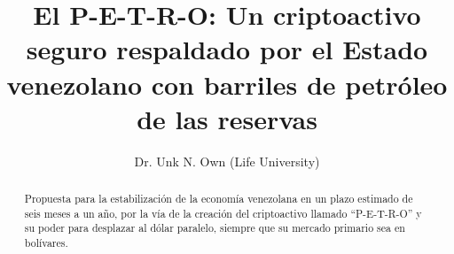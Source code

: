 \documentclass[spanish,letterpaper,11pt]{article}
\title{\bf El  P-E-T-R-O: Un criptoactivo seguro respaldado por el Estado venezolano con barriles de petróleo de las reservas}
\author{
     Dr. Unk N. Own (Life University)\\
}
\date{}
\begin{document}

\maketitle

\begin{abstract}
Propuesta para la estabilización de la economía venezolana en un plazo estimado de seis meses a un año, por la vía de la creación del criptoactivo llamado “P-E-T-R-O” y su poder para desplazar al dólar paralelo, siempre que su mercado primario sea en bolívares.
\end{abstract}

\setlength{\columnsep}{20pt}

\tableofcontents












\renewcommand{\appendixname}{Anexos}
\begin{appendices} %




%

\end{appendices}
\end{document}
